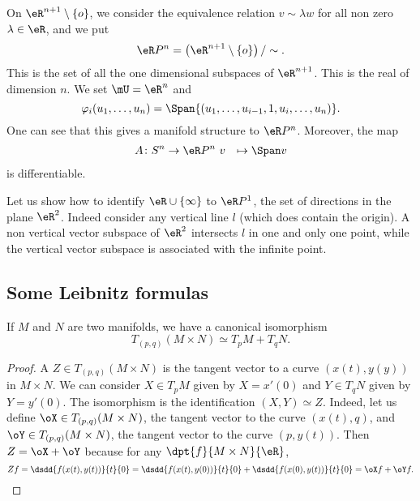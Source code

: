 On $\eR^{n+1}\setminus\{o\}$, we consider the equivalence relation $v\sim\lambda w$ for all non zero $\lambda\in\eR$, and we put
\[
  \eR P^n=\left(\eR^{n+1}\setminus\{o\}\right)/\sim.
\]
This is the set of all the one dimensional subspaces of $\eR^{n+1}$. This is the real  of dimension $n$. We set $\mU=\eR^n$ and
\[
  \varphi_i(u_1,\ldots,u_n)=\Span\{ (u_1,\ldots,u_{i-1},1,u_i,\ldots,u_n) \}.
\]
One can see that this gives a manifold structure to $\eR P^n$. Moreover, the map
		\begin{equation}
		\begin{aligned}
			A \colon S^n &\to \eR P^n\
			v&\mapsto \Span v
		\end{aligned}
	\end{equation}
is differentiable.

Let us show how to identify $\eR\cup\{ \infty \}$ to $\eR P^1$, the set of directions in the plane $\eR^2$. Indeed consider any vertical line $l$ (which does contain the origin). A non vertical vector subspace of $\eR^2$ intersects $l$ in one and only one point, while the vertical vector subspace is associated with the infinite point.

\subsection{Some Leibnitz formulas}

\begin{lemma}
If $M$ and $N$ are two manifolds, we have a canonical isomorphism
\[
     T_{(p,q)}(M\times N)\simeq T_pM+T_qN.
\]
\label{lemLeibnitz}
\end{lemma}

\begin{proof}
A $Z\in T_{(p,q)}(M\times N)$ is the tangent vector to a curve $(x(t),y(y))$ in $M\times N$. We can consider $X\in T_pM$ given by $X=x'(0)$ and $Y\in T_qN$ given by $Y=y'(0)$. The isomorphism is the identification $(X,Y)\simeq Z$. Indeed, let us define $\oX\in T_{(p,q)}(M\times N)$, the tangent vector to the curve $(x(t),q)$, and $\oY\in T_{(p,q)}(M\times N)$, the tangent vector to the curve $(p,y(t))$. Then $Z=\oX+\oY$ because for any $\dpt{f}{M\times N}{\eR}$,
\begin{equation}
 Zf=\dsdd{f(x(t),y(t))}{t}{0}
   =\dsdd{f(x(t),y(0))}{t}{0}+\dsdd{f(x(0),y(t))}{t}{0}
   =\oX f+\oY f.
\end{equation}
\end{proof}


